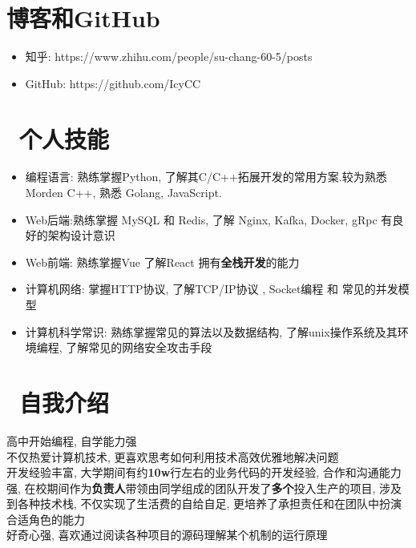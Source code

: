 \documentclass{resume}
\begin{document}
\section{\faRssSquare 博客和GitHub}
\begin{itemize}[parsep=0.5ex]
  \item 知乎: https://www.zhihu.com/people/su-chang-60-5/posts
  \item GitHub: https://github.com/IcyCC
\end{itemize}

\section{\faCogs\ 个人技能}
\begin{itemize}[parsep=0.5ex]
  \item 编程语言: 熟练掌握Python, 了解其C/C++拓展开发的常用方案.较为熟悉 Morden C++, 熟悉 Golang, JavaScript.
  \item Web后端:熟练掌握 MySQL 和 Redis,
  了解 Nginx, Kafka,  Docker, gRpc
  有良好的架构设计意识
  \item Web前端: 熟练掌握Vue 了解React 拥有\textbf{全栈开发}的能力
  \item 计算机网络: 掌握HTTP协议, 了解TCP/IP协议 , Socket编程 和 常见的并发模型 
  \item 计算机科学常识: 熟练掌握常见的算法以及数据结构,
  了解unix操作系统及其环境编程, 
  了解常见的网络安全攻击手段
\end{itemize}

\section{\faInfo\ 自我介绍}
  高中开始编程, 自学能力强\\
  不仅热爱计算机技术, 更喜欢思考如何利用技术高效优雅地解决问题\\
  开发经验丰富, 大学期间有约\textbf{10w}行左右的业务代码的开发经验, 合作和沟通能力强, 在校期间作为\textbf{负责人}带领由同学组成的团队开发了\textbf{多个}投入生产的项目, 涉及到各种技术栈, 不仅实现了生活费的自给自足, 更培养了承担责任和在团队中扮演合适角色的能力\\  
  好奇心强, 喜欢通过阅读各种项目的源码理解某个机制的运行原理\\
%
%
\end{document}
